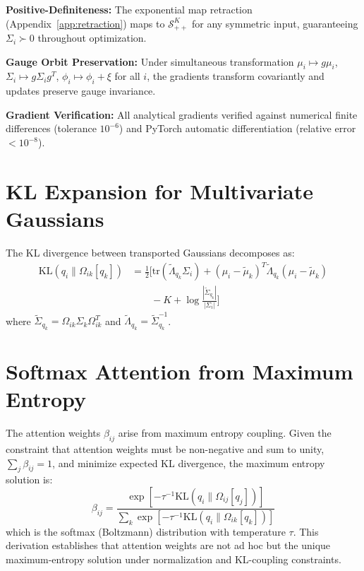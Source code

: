 \documentclass[11pt]{article}
\begin{document}
\textbf{Positive-Definiteness:} The exponential map retraction (Appendix~\ref{app:retraction}) maps to $\mathcal{S}_{++}^K$ for any symmetric input, guaranteeing $\Sigma_i \succ 0$ throughout optimization.

\textbf{Gauge Orbit Preservation:} Under simultaneous transformation $\mu_i \mapsto g\mu_i$, $\Sigma_i \mapsto g\Sigma_i g^T$, $\phi_i \mapsto \phi_i + \xi$ for all $i$, the gradients transform covariantly and updates preserve gauge invariance.

\textbf{Gradient Verification:} All analytical gradients verified against numerical finite differences (tolerance $10^{-6}$) and PyTorch automatic differentiation (relative error $< 10^{-8}$).

\section{KL Expansion for Multivariate Gaussians}
\label{app:kl}

The KL divergence between transported Gaussians decomposes as:
\begin{align}
\mathrm{KL}(q_i \| \Omega_{ik}[q_k]) &= \frac{1}{2}\Big[\mathrm{tr}(\tilde{\Lambda}_{q_k}\Sigma_i) + (\mu_i - \tilde{\mu}_k)^T\tilde{\Lambda}_{q_k}(\mu_i - \tilde{\mu}_k) \nonumber \\
&\qquad - K + \log\frac{|\tilde{\Sigma}_{q_k}|}{|\Sigma_i|}\Big]
\end{align}
where $\tilde{\Sigma}_{q_k} = \Omega_{ik}\Sigma_k\Omega_{ik}^T$ and $\tilde{\Lambda}_{q_k} = \tilde{\Sigma}_{q_k}^{-1}$.

\section{Softmax Attention from Maximum Entropy}
\label{app:softmax}

The attention weights $\beta_{ij}$ arise from maximum entropy coupling. Given the constraint that attention weights must be non-negative and sum to unity, $\sum_j\beta_{ij} = 1$, and minimize expected KL divergence, the maximum entropy solution is:
\begin{equation}
\beta_{ij} = \frac{\exp[-\tau^{-1}\mathrm{KL}(q_i \| \Omega_{ij}[q_j])]}{\sum_k\exp[-\tau^{-1}\mathrm{KL}(q_i \| \Omega_{ik}[q_k])]}
\end{equation}
which is the softmax (Boltzmann) distribution with temperature $\tau$. This derivation establishes that attention weights are not ad hoc but the unique maximum-entropy solution under normalization and KL-coupling constraints.
\end{document}

